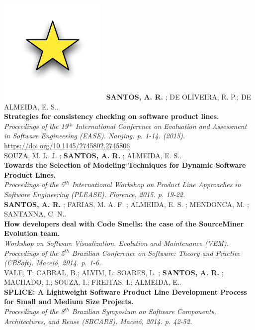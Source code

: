 \documentclass[nocolors]{friggeri-cv-a4}
\begin{document}
\includegraphics[scale=.15]{img/star.pdf}~ \textbf{SANTOS, A. R.}  ; DE OLIVEIRA, R. P.; DE ALMEIDA, E. S..\\
\textbf{Strategies for consistency checking on software product lines.}\\
\emph{Proceedings of the 19$^{th}$ International Conference on Evaluation and Assessment in Software Engineering (EASE). Nanjing.  p. 1-14. (2015).}\\
\url{https://doi.org/10.1145/2745802.2745806}.\\

SOUZA, M. L. J. ; \textbf{SANTOS, A. R.}  ; ALMEIDA, E. S.. \\
\textbf{Towards the Selection of Modeling Techniques for Dynamic Software Product Lines.} \\
\emph{Proceedings of the 5$^{th}$ International Workshop on Product Line Approaches in Software Engineering (PLEASE). Florence, 2015. p. 19-22. }\\

\textbf{SANTOS, A. R.}  ; FARIAS, M. A. F. ; ALMEIDA, E. S. ; MENDONCA, M. ; SANTANNA, C. N..\\ 
\textbf{How developers deal with Code Smells: the case of the SourceMiner Evolution team.} \\
\emph{Workshop on Software Visualization, Evolution and Maintenance (VEM).
	Proceedings of the 5$^{th}$ Brazilian Conference on Software: Theory and Practice (CBSoft). Maceió, 2014. p. 1-6.}\\

VALE, T; CABRAL, B.; ALVIM, L; SOARES, L. ; \textbf{SANTOS, A. R.} ; MACHADO, I.; SOUZA, I.; FREITAS, I.; ALMEIDA, E..\\
\textbf{SPLICE: A Lightweight Software Product Line Development Process for Small and Medium Size Projects.} \\
\emph{Proceedings of the 8$^{th}$ Brazilian Symposium on Software Components, Architectures, and Reuse (SBCARS). Maceió, 2014. p. 42-52.}\\
\end{document}
